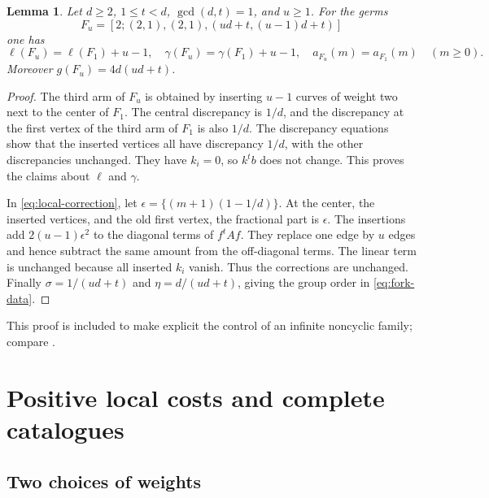 \documentclass[12pt,a4paper]{article}
\numberwithin{equation}{section}
\newtheorem{lemma}[theorem]{Lemma}
\theoremstyle{definition}
\begin{document}
\begin{lemma}\label{lem:fork-extension}
Let \(d\geq2\), \(1\leq t<d\), \(\gcd(d,t)=1\), and \(u\geq1\).
For the germs
\[
 F_u=[2;(2,1),(2,1),(ud+t,(u-1)d+t)]
\]
one has
\[
 \ell(F_u)=\ell(F_1)+u-1,\quad
 \gamma(F_u)=\gamma(F_1)+u-1,\quad
 a_{F_u}(m)=a_{F_1}(m)\quad(m\geq0).
\]
Moreover \(g(F_u)=4d(ud+t)\).
\end{lemma}

\begin{proof}
The third arm of \(F_u\) is obtained by inserting \(u-1\)
curves of weight two next to the center of \(F_1\).
The central discrepancy is \(1/d\), and the discrepancy at the
first vertex of the third arm of \(F_1\) is also \(1/d\).
The discrepancy equations show that the inserted vertices all have
discrepancy \(1/d\), with the other discrepancies unchanged.
They have \(k_i=0\), so \(k^tb\) does not change. This proves
the claims about \(\ell\) and \(\gamma\).

In \eqref{eq:local-correction}, let
\(\epsilon=\{(m+1)(1-1/d)\}\). At the center, the inserted vertices,
and the old first vertex, the fractional part is \(\epsilon\).
The insertions add \(2(u-1)\epsilon^2\) to the diagonal terms of
\(f^tAf\). They replace one edge by \(u\) edges and hence subtract
the same amount from the off-diagonal terms. The linear term is
unchanged because all inserted \(k_i\) vanish. Thus the corrections
are unchanged. Finally \(\sigma=1/(ud+t)\) and
\(\eta=d/(ud+t)\), giving the group order in \eqref{eq:fork-data}.
\end{proof}

This proof is included to make explicit the control of an infinite
noncyclic family; compare \cite[Lemma 9.5]{LL26stable}.

\section{Positive local costs and complete catalogues}\label{sec:cost}

\subsection{Two choices of weights}
\end{document}
